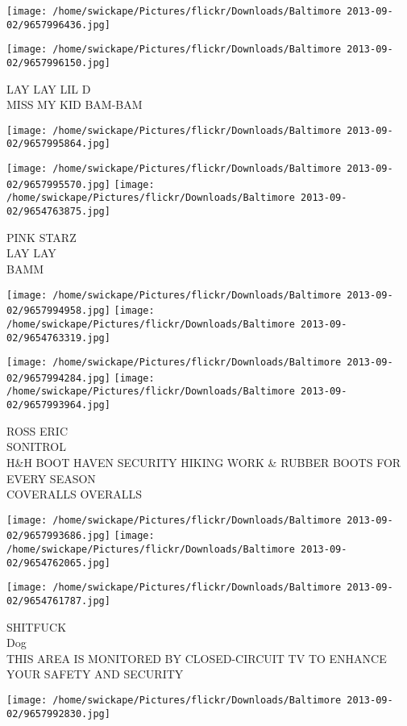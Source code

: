 \documentclass[10pt,letterpaper]{article}
\begin{document}
\texttt{[image: /home/swickape/Pictures/flickr/Downloads/Baltimore 2013-09-02/9657996436.jpg]}

\vspace{0.25in}
\texttt{[image: /home/swickape/Pictures/flickr/Downloads/Baltimore 2013-09-02/9657996150.jpg]}

LAY LAY LIL D\\
MISS MY KID BAM{-}BAM
\pagebreak

\texttt{[image: /home/swickape/Pictures/flickr/Downloads/Baltimore 2013-09-02/9657995864.jpg]}

\vspace{0.25in}
\texttt{[image: /home/swickape/Pictures/flickr/Downloads/Baltimore 2013-09-02/9657995570.jpg]}
\texttt{[image: /home/swickape/Pictures/flickr/Downloads/Baltimore 2013-09-02/9654763875.jpg]}

PINK STARZ\\
LAY LAY\\
BAMM
\pagebreak

\texttt{[image: /home/swickape/Pictures/flickr/Downloads/Baltimore 2013-09-02/9657994958.jpg]}
\texttt{[image: /home/swickape/Pictures/flickr/Downloads/Baltimore 2013-09-02/9654763319.jpg]}

\texttt{[image: /home/swickape/Pictures/flickr/Downloads/Baltimore 2013-09-02/9657994284.jpg]}
\texttt{[image: /home/swickape/Pictures/flickr/Downloads/Baltimore 2013-09-02/9657993964.jpg]}

ROSS ERIC\\
SONITROL\\
H\&H BOOT HAVEN SECURITY HIKING WORK \& RUBBER BOOTS FOR EVERY SEASON\\
COVERALLS OVERALLS
\pagebreak

\texttt{[image: /home/swickape/Pictures/flickr/Downloads/Baltimore 2013-09-02/9657993686.jpg]}
\texttt{[image: /home/swickape/Pictures/flickr/Downloads/Baltimore 2013-09-02/9654762065.jpg]}

\texttt{[image: /home/swickape/Pictures/flickr/Downloads/Baltimore 2013-09-02/9654761787.jpg]}

SHITFUCK\\
Dog\\
THIS AREA IS MONITORED BY CLOSED{-}CIRCUIT TV TO ENHANCE YOUR SAFETY AND SECURITY
\pagebreak

\texttt{[image: /home/swickape/Pictures/flickr/Downloads/Baltimore 2013-09-02/9657992830.jpg]}
\end{document}
